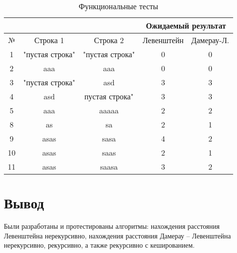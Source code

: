 \begin{table}[h]
	\begin{center}
		\captionsetup{justification=raggedright,singlelinecheck=off}
		\caption{\label{tabular:functional_test} Функциональные тесты}
		\begin{tabular}{|c|c|c|c|c|}
			\hline
			& & & \multicolumn{2}{c|}{Ожидаемый результат} \\
			\hline
			№&Строка 1&Строка 2&Левенштейн&Дамерау-Л. \\
			\hline
			1&"пустая строка"&"пустая строка"&0&0 \\
			\hline
			2&aaa&aaa&0&0 \\
			\hline
			3&"пустая строка"&asd&3&3 \\
			\hline
			4&asd&пустая строка"&3&3 \\
			\hline
			5&aaa&aaaaa&2&2 \\
			\hline
			8&as&sa&2&1 \\
			\hline
			9&asas&sasa&4&2 \\
			\hline
			10&asas&saas&2&1 \\
			\hline
			11&asas&saasa&3&2 \\
			\hline
		\end{tabular}
	\end{center}
\end{table}


\section*{Вывод}

Были разработаны и протестированы алгоритмы: нахождения расстояния Левенштейна нерекурсивно, нахождения расстояния Дамерау -- Левенштейна нерекурсивно, рекурсивно, а также рекурсивно с кешированием.
